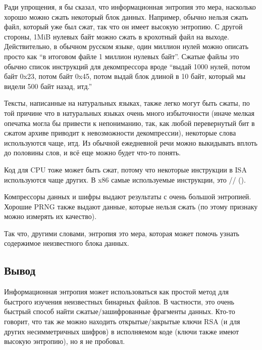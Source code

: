 \label{entropy}

Ради упрощения, я бы сказал, что информационная энтропия это мера, насколько хорошо можно сжать
некоторый блок данных.
Например, обычно нельзя сжать файл, который уже был сжат, так что он имеет высокую энтропию.
С другой стороны, 1MiB нулевых байт можно сжать в крохотный файл на выходе.
Действительно, в обычном русском языке, один миллион нулей можно описать просто как
``в итоговом файле 1 миллион нулевых байт''.
Сжатые файлы это обычно список инструкций для декомпрессора вроде
``выдай 1000 нулей, потом байт 0x23, потом байт 0x45, потом выдай блок длиной в 10 байт, который мы видели 500 байт назад,
итд.''

Тексты, написанные на натуральных языках, также легко могут быть сжаты, по той причине что в натуральных языках очень
много избыточности (иначе мелкая опечатка могла бы привести к непониманию, так, как любой перевернутый бит в сжатом
архиве приводит к невозможности декомпрессии),
некоторые слова используются чаще, итд.
Из обычной ежедневной речи можно выкидывать вплоть до половины слов, и всё еще можно будет что-то понять.

Код для CPU тоже может быть сжат, потому что некоторые инструкции в \ac{ISA} используются чаще других.
В x86 самые используемые инструкции, это // ().

Компрессоры данных и шифры выдают результаты с очень большой энтропией.
Хорошие \ac{PRNG} также выдают данные, которые нельзя сжать
(по этому признаку можно измерять их качество).

Так что, другими словами, энтропия это мера, которая может помочь узнать содержимое неизвестного блока данных.



\subsection{Вывод}

Информационная энтропия может использоваться как простой метод для быстрого изучения неизвестных бинарных файлов.
В частности, это очень быстрый способ найти сжатые/зашифрованные фрагменты данных.
Кто-то говорит, что так же можно находить открытые/закрытые ключи \ac{RSA} (и для других несимметричных шифров)
в исполняемом коде (ключи также имеют  высокую энтропию), но я не пробовал.

